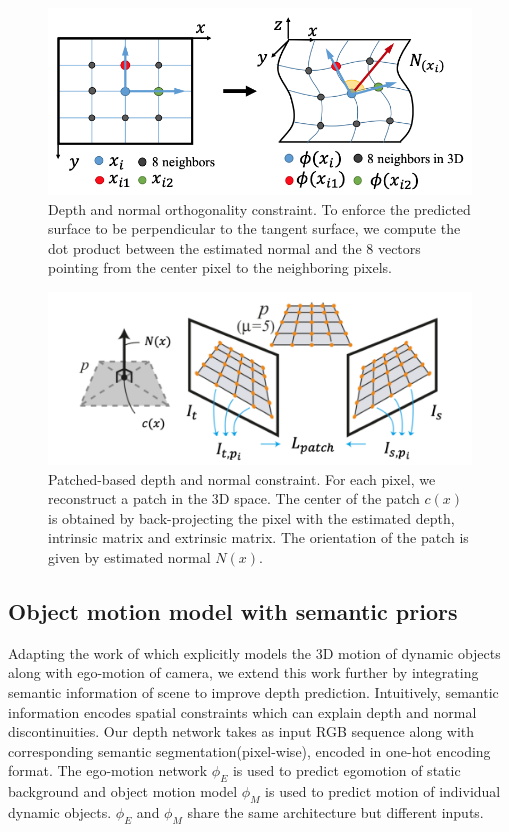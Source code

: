 \documentclass[10pt,twocolumn,letterpaper]{article}
\begin{document}
\begin{figure}
  \includegraphics[width=\columnwidth ]{8point.png}
  \caption{Depth and normal orthogonality constraint. To enforce the predicted surface to be perpendicular to the tangent surface, we compute the dot product between the estimated normal and the 8 vectors pointing from the center pixel to the neighboring pixels.}
  \label{fig:8point}
\end{figure}
\begin{figure}
  \includegraphics[width=\columnwidth ]{patch.png}
  \caption{Patched-based depth and normal constraint. For each pixel, we reconstruct a patch in the 3D space. The center of the patch $c(x)$ is obtained by back-projecting the pixel with the estimated depth, intrinsic matrix and extrinsic matrix. The orientation of the patch is given by estimated normal $N(x)$.}
  \label{fig:patch}
\end{figure}

\subsection{Object motion model with semantic priors}
Adapting the work of \cite{casser2018depth} which explicitly models the 3D motion of dynamic objects along with ego-motion of camera, we extend this work further by integrating semantic information of scene to improve depth prediction. Intuitively, semantic information encodes spatial constraints which can explain depth and normal discontinuities. Our depth network takes as input RGB sequence along with corresponding semantic segmentation(pixel-wise), encoded in one-hot encoding format. The ego-motion network $\phi_{E}$ is used to predict egomotion of static background and object motion model $\phi_{M}$ is used to predict motion of individual dynamic objects. $\phi_{E}$ and $\phi_{M}$ share the same architecture but different inputs. 
\end{document}
